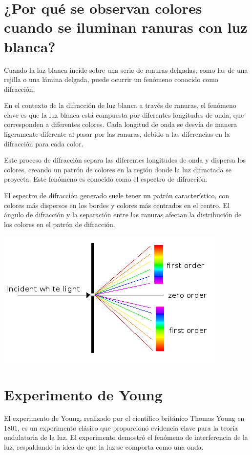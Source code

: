 \documentclass[a4paper,12pt]{article}
\newenvironment{Figure}
  {\par\medskip\noindent\minipage{\linewidth}}
  {\endminipage\par\medskip}
\begin{document}
\section*{¿Por qué se observan colores cuando se iluminan ranuras con luz blanca?}

    Cuando la luz blanca incide sobre una serie de ranuras delgadas, como las de una rejilla o una lámina delgada, puede ocurrir un fenómeno conocido como difracción.

    En el contexto de la difracción de luz blanca a través de ranuras, el fenómeno clave es que la luz blanca está compuesta por diferentes longitudes de onda, que corresponden a diferentes colores. Cada longitud de onda se desvía de manera ligeramente diferente al pasar por las ranuras, debido a las diferencias en la difracción para cada color.

    Este proceso de difracción separa las diferentes longitudes de onda y dispersa los colores, creando un patrón de colores en la región donde la luz difractada se proyecta. Este fenómeno es conocido como el espectro de difracción.

    El espectro de difracción generado suele tener un patrón característico, con colores más dispersos en los bordes y colores más centrados en el centro. El ángulo de difracción y la separación entre las ranuras afectan la distribución de los colores en el patrón de difracción.

    \begin{Figure}
        \centering
        \includegraphics[width=0.6\linewidth]{Diffraction.png}
        \label{fig: patronDifraccion}
    \end{Figure}

\section*{Experimento de Young}

    El experimento de Young, realizado por el científico británico Thomas Young en 1801, es un experimento clásico que proporcionó evidencia clave para la teoría ondulatoria de la luz. El experimento demostró el fenómeno de interferencia de la luz, respaldando la idea de que la luz se comporta como una onda.
\end{document}
